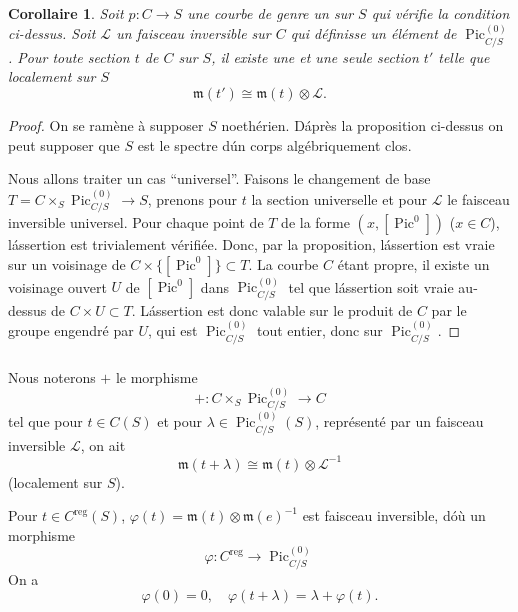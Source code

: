 \documentclass{amsart}
\theoremstyle{plain}
\newtheorem{corollary}[theorem]{Corollaire}
\theoremstyle{remark}
\DeclareMathOperator{\Pic}{Pic}
\newcommand{\cL}{\mathcal{L}}
\begin{document}
\begin{corollary}
Soit $p: C \to S$ une courbe de genre un sur $S$ qui v\'erifie la condition ci-dessus.
Soit $\cL$ un faisceau inversible sur $C$ qui d\'efinisse un \'el\'ement de
$\Pic^{(0)}_{C/S}$. Pour toute section $t$ de $C$ sur $S$, il existe une et une seule
section $t'$ telle que localement sur $S$
\[
\mathfrak{m}(t') \cong \mathfrak{m}(t) \otimes \cL.
\]
\end{corollary}

\begin{proof}
On se ram\`ene \`a supposer $S$ noeth\'erien. D\'apr\`es la proposition ci-dessus on peut
supposer que $S$ est le spectre d\'un corps alg\'ebriquement clos.

Nous allons traiter un cas ``universel''. Faisons le changement de base
$T = C \times_S \Pic^{(0)}_{C/S} \to S$, prenons pour $t$ la section universelle et pour
$\cL$ le faisceau inversible universel. Pour chaque point de $T$ de la forme
$(x, [\Pic^0])$ ($x \in C$), l\'assertion est trivialement v\'erifi\'ee. Donc, par la
proposition, l\'assertion est vraie sur un voisinage de $C \times \{[\Pic^0]\} \subset T$.
La courbe $C$ \'etant propre, il existe un voisinage ouvert $U$ de $[\Pic^0]$ dans
$\Pic^{(0)}_{C/S}$ tel que l\'assertion soit vraie au-dessus de $C \times U \subset T$.
L\'assertion est donc valable sur le produit de $C$ par le groupe engendr\'e par $U$,
qui est $\Pic^{(0)}_{C/S}$ tout entier, donc sur $\Pic^{(0)}_{C/S}$.
\end{proof}

\subsubsection{}
Nous noterons $+$ le morphisme
\[
+: C \times_S \Pic^{(0)}_{C/S} \to C
\]
tel que pour $t \in C(S)$ et pour $\lambda \in \Pic^{(0)}_{C/S}(S)$, repr\'esent\'e par un
faisceau inversible $\cL$, on ait
\begin{equation}
\mathfrak{m}(t + \lambda) \cong \mathfrak{m}(t) \otimes \cL^{-1}
\end{equation}
(localement sur $S$).

Pour $t \in C^{\mathrm{reg}}(S)$, $\varphi(t) = \mathfrak{m}(t) \otimes \mathfrak{m}(e)^{-1}$ est
faisceau inversible, d\'o\`u un morphisme
\begin{equation}
\varphi: C^{\mathrm{reg}} \to \Pic^{(0)}_{C/S}
\end{equation}
On a
\begin{equation}
\varphi(0) = 0, \quad \varphi(t + \lambda) = \lambda + \varphi(t).
\end{equation}
\end{document}
